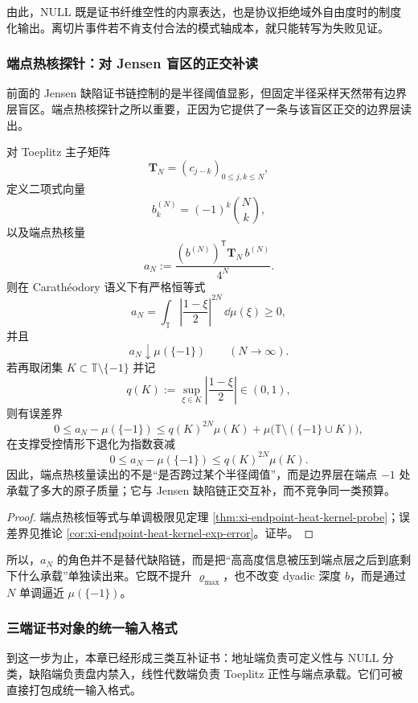由此，\(\mathrm{NULL}\) 既是证书纤维空性的内禀表达，也是协议拒绝域外自由度时的制度化输出。离切片事件若不肯支付合法的模式轴成本，就只能转写为失败见证。

\subsubsection{端点热核探针：对 Jensen 盲区的正交补读}\label{subsubsec:typed-address-biaxial-completion-endpoint-heat-kernel-complement}
前面的 Jensen 缺陷证书链控制的是半径阈值显影，但固定半径采样天然带有边界层盲区。端点热核探针之所以重要，正因为它提供了一条与该盲区正交的边界层读出。

\begin{proposition}[端点热核量的正交补读性质]\label{prop:typed-address-biaxial-completion-endpoint-heat-kernel-complement}
对 Toeplitz 主子矩阵
\[
\mathbf{T}_N=(c_{j-k})_{0\le j,k\le N},
\]
定义二项式向量
\[
b^{(N)}_k=(-1)^k\binom{N}{k},
\]
以及端点热核量
\[
a_N:=\frac{(b^{(N)})^{\mathsf T}\mathbf{T}_N\,b^{(N)}}{4^N}.
\]
则在 Carath\'eodory 语义下有严格恒等式
\[
a_N=
\int_{\mathbb T}\left|\frac{1-\xi}{2}\right|^{2N}\,\dd\mu(\xi)\ge 0,
\]
并且
\[
a_N\downarrow \mu(\{-1\})\qquad(N\to\infty).
\]
若再取闭集 \(K\subset\mathbb T\setminus\{-1\}\) 并记
\[
q(K):=\sup_{\xi\in K}\left|\frac{1-\xi}{2}\right|\in(0,1),
\]
则有误差界
\[
0\le a_N-\mu(\{-1\})
\le
q(K)^{2N}\mu(K)+\mu\!\bigl(\mathbb T\setminus(\{-1\}\cup K)\bigr),
\]
在支撑受控情形下退化为指数衰减
\[
0\le a_N-\mu(\{-1\})\le q(K)^{2N}\mu(K).
\]
因此，端点热核量读出的不是“是否跨过某个半径阈值”，而是边界层在端点 \(-1\) 处承载了多大的原子质量；它与 Jensen 缺陷链正交互补，而不竞争同一类预算。
\end{proposition}
\begin{proof}
端点热核恒等式与单调极限见定理 \ref{thm:xi-endpoint-heat-kernel-probe}；误差界见推论 \ref{cor:xi-endpoint-heat-kernel-exp-error}。证毕。
\end{proof}

所以，\(a_N\) 的角色并不是替代缺陷链，而是把“高高度信息被压到端点层之后到底剩下什么承载”单独读出来。它既不提升 \(\varrho_{\max}\)，也不改变 dyadic 深度 \(b\)，而是通过 \(N\) 单调逼近 \(\mu(\{-1\})\)。

\subsubsection{三端证书对象的统一输入格式}\label{subsubsec:typed-address-biaxial-completion-three-end-input}
到这一步为止，本章已经形成三类互补证书：地址端负责可定义性与 \(\mathrm{NULL}\) 分类，缺陷端负责盘内禁入，线性代数端负责 Toeplitz 正性与端点承载。它们可被直接打包成统一输入格式。

